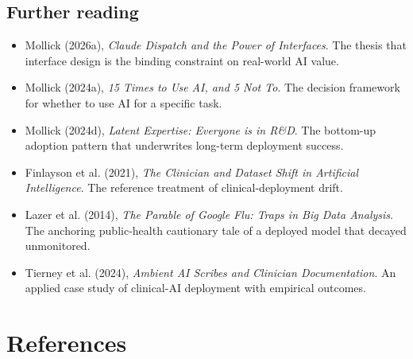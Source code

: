 \documentclass[
  letterpaper,
  11pt]{scrbook}
\providecommand{\tightlist}{%
  \setlength{\itemsep}{0pt}\setlength{\parskip}{0pt}}
\begin{document}
\section{Further reading}\label{further-reading-13}

\begin{itemize}
\tightlist
\item
  Mollick (2026a), \emph{Claude Dispatch and the Power of Interfaces}.
  The thesis that interface design is the binding constraint on
  real-world AI value.
\item
  Mollick (2024a), \emph{15 Times to Use AI, and 5 Not To}. The decision
  framework for whether to use AI for a specific task.
\item
  Mollick (2024d), \emph{Latent Expertise: Everyone is in R\&D}. The
  bottom-up adoption pattern that underwrites long-term deployment
  success.
\item
  Finlayson et al. (2021), \emph{The Clinician and Dataset Shift in
  Artificial Intelligence}. The reference treatment of
  clinical-deployment drift.
\item
  Lazer et al. (2014), \emph{The Parable of Google Flu: Traps in Big
  Data Analysis}. The anchoring public-health cautionary tale of a
  deployed model that decayed unmonitored.
\item
  Tierney et al. (2024), \emph{Ambient AI Scribes and Clinician
  Documentation}. An applied case study of clinical-AI deployment with
  empirical outcomes.
\end{itemize}


\chapter*{References}\label{references}

\end{document}
